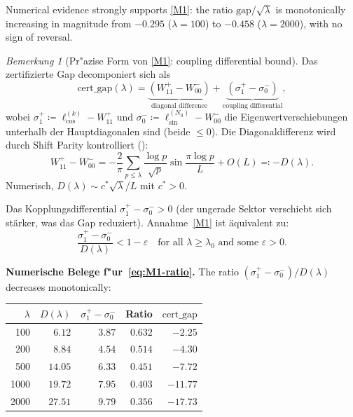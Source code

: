 \documentclass[12pt,a4paper]{article}
\theoremstyle{definition}
\theoremstyle{remark}
\newtheorem{remark}[theorem]{Bemerkung}
\begin{document}
Numerical evidence strongly supports \ref{M1}: the ratio $\mathrm{gap}/\sqrt{\lambda}$ is monotonically increasing in magnitude from $-0.295$ ($\lambda = 100$) to $-0.458$ ($\lambda = 2000$), with no sign of reversal.

\begin{remark}[Pr"azise Form von \ref{M1}: coupling differential bound]
\label{rem:M1-precise}
Das zertifizierte Gap decomponiert sich als
\begin{equation}
\label{eq:gap-decomp}
  \mathrm{cert\_gap}(\lambda) = \underbrace{(W_{11}^+ - W_{00}^-)}_{\text{diagonal difference}} + \underbrace{(\sigma^+_1 - \sigma^-_0)}_{\text{coupling differential}},
\end{equation}
wobei $\sigma^+_1 \coloneqq \ell_{\cos}^{(k)} - W_{11}^+$ und $\sigma^-_0 \coloneqq \ell_{\sin}^{(N_0)} - W_{00}^-$ die Eigenwertverschiebungen unterhalb der Hauptdiagonalen sind (beide $\leq 0$). Die Diagonaldifferenz wird durch Shift Parity kontrolliert ():
\[
  W_{11}^+ - W_{00}^- = -\frac{2}{\pi}\sum_{p \leq \lambda}\frac{\log p}{\sqrt{p}}\sin\frac{\pi\log p}{L} + O(L) \eqqcolon -D(\lambda).
\]
Numerisch, $D(\lambda) \sim c^*\sqrt{\lambda}/L$ mit $c^* > 0$.

Das Kopplungsdifferential $\sigma^+_1 - \sigma^-_0 > 0$ (der ungerade Sektor verschiebt sich stärker, was das Gap reduziert). Annahme~\ref{M1} ist äquivalent zu:
\begin{equation}
\label{eq:M1-ratio}
  \frac{\sigma^+_1 - \sigma^-_0}{D(\lambda)} < 1 - \varepsilon \quad\text{for all } \lambda \geq \lambda_0 \text{ and some } \varepsilon > 0.
\end{equation}
\end{remark}

\noindent\textbf{Numerische Belege f"ur~\eqref{eq:M1-ratio}.} The ratio $(\sigma^+_1 - \sigma^-_0)/D(\lambda)$ decreases monotonically:

\begin{center}
\small
\renewcommand{\arraystretch}{1.15}
\begin{tabular}{r|r|r|r|r}
$\lambda$ & $D(\lambda)$ & $\sigma_1^+\! -\! \sigma_0^-$ & Ratio & $\mathrm{cert\_gap}$ \\\hline
100  & $6.12$  & $3.87$ & $0.632$ & $-2.25$ \\
200  & $8.84$  & $4.54$ & $0.514$ & $-4.30$ \\
500  & $14.05$ & $6.33$ & $0.451$ & $-7.72$ \\
1000 & $19.72$ & $7.95$ & $0.403$ & $-11.77$ \\
2000 & $27.51$ & $9.79$ & $0.356$ & $-17.73$
\end{tabular}
\end{center}
\end{document}

